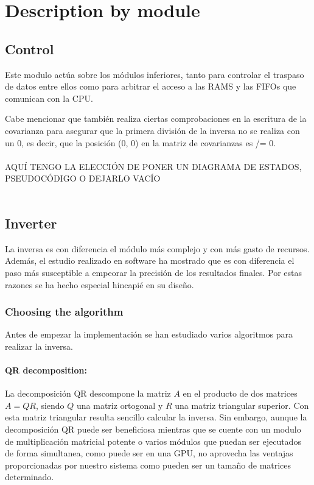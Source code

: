 \section{Description by module}
\subsection{Control}
Este modulo actúa sobre los módulos inferiores, tanto para controlar el traspaso de datos entre ellos como para arbitrar el acceso a las RAMS y las FIFOs que comunican con la CPU.

Cabe mencionar que también realiza ciertas comprobaciones en la escritura de la covarianza para asegurar que la primera división de la inversa no se realiza con un 0, es decir, que la posición (0, 0) en la matriz de covarianzas es /= 0.
\\
\\
AQUÍ TENGO LA ELECCIÓN DE PONER UN DIAGRAMA DE ESTADOS, PSEUDOCÓDIGO O DEJARLO VACÍO
\\
\\

\subsection{Inverter}
La inversa es con diferencia el módulo más complejo y con más gasto de recursos. Además, el estudio realizado en software ha mostrado que es con diferencia el paso más susceptible a empeorar la precisión de los resultados finales. Por estas razones se ha hecho especial hincapié en su diseño.
\\
\subsubsection{Choosing the algorithm}
Antes de empezar la implementación se han estudiado varios algoritmos para realizar la inversa.
\paragraph{QR decomposition:}
La decomposición QR descompone la matriz $A$ en el producto de dos matrices $A = QR$, siendo $Q$ una matriz ortogonal y $R$ una matriz triangular superior. Con esta matriz triangular resulta sencillo calcular la inversa. Sin embargo, aunque la decomposición QR puede ser beneficiosa mientras que se cuente con un modulo de multiplicación matricial potente o varios módulos que puedan ser ejecutados de forma simultanea, como puede ser en una GPU, no aprovecha las ventajas proporcionadas por nuestro sistema como pueden ser un tamaño de matrices determinado.
